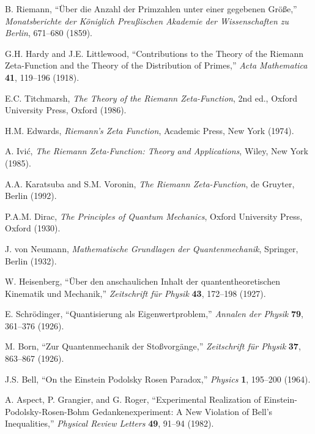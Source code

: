 \documentclass[11pt]{article}
\theoremstyle{plain}
\theoremstyle{definition}
\theoremstyle{remark}
\begin{document}
\begin{thebibliography}{99}

 B. Riemann, ``Über die Anzahl der Primzahlen unter einer gegebenen Größe,'' \emph{Monatsberichte der Königlich Preußischen Akademie der Wissenschaften zu Berlin}, 671--680 (1859).

 G.H. Hardy and J.E. Littlewood, ``Contributions to the Theory of the Riemann Zeta-Function and the Theory of the Distribution of Primes,'' \emph{Acta Mathematica} \textbf{41}, 119--196 (1918).

 E.C. Titchmarsh, \emph{The Theory of the Riemann Zeta-Function}, 2nd ed., Oxford University Press, Oxford (1986).

 H.M. Edwards, \emph{Riemann's Zeta Function}, Academic Press, New York (1974).

 A. Ivić, \emph{The Riemann Zeta-Function: Theory and Applications}, Wiley, New York (1985).

 A.A. Karatsuba and S.M. Voronin, \emph{The Riemann Zeta-Function}, de Gruyter, Berlin (1992).

 P.A.M. Dirac, \emph{The Principles of Quantum Mechanics}, Oxford University Press, Oxford (1930).

 J. von Neumann, \emph{Mathematische Grundlagen der Quantenmechanik}, Springer, Berlin (1932).

 W. Heisenberg, ``Über den anschaulichen Inhalt der quantentheoretischen Kinematik und Mechanik,'' \emph{Zeitschrift für Physik} \textbf{43}, 172--198 (1927).

 E. Schrödinger, ``Quantisierung als Eigenwertproblem,'' \emph{Annalen der Physik} \textbf{79}, 361--376 (1926).

 M. Born, ``Zur Quantenmechanik der Stoßvorgänge,'' \emph{Zeitschrift für Physik} \textbf{37}, 863--867 (1926).

 J.S. Bell, ``On the Einstein Podolsky Rosen Paradox,'' \emph{Physics} \textbf{1}, 195--200 (1964).

 A. Aspect, P. Grangier, and G. Roger, ``Experimental Realization of Einstein-Podolsky-Rosen-Bohm Gedankenexperiment: A New Violation of Bell's Inequalities,'' \emph{Physical Review Letters} \textbf{49}, 91--94 (1982).


\end{thebibliography}
\end{document}
